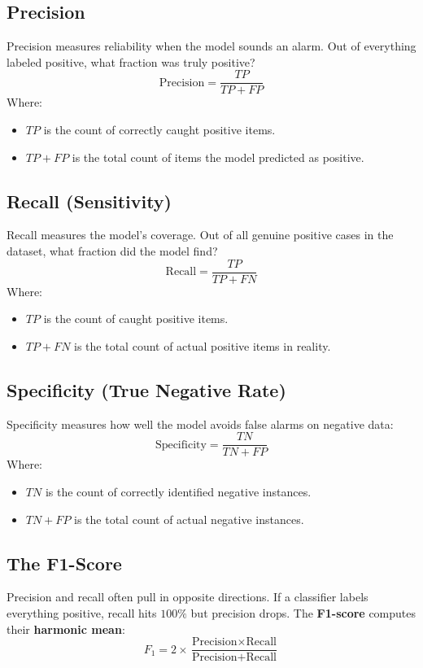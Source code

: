 \documentclass[a4paper,11pt]{article}
\newcommand{\vocab}[1]{\textbf{#1}}
\begin{document}
\subsection{Precision}
Precision measures reliability when the model sounds an alarm.
Out of everything labeled positive, what fraction was truly positive?
\begin{equation}
\text{Precision} = \frac{TP}{TP + FP}
\end{equation}
Where:
\begin{itemize}
  \item $TP$ is the count of correctly caught positive items.
  \item $TP + FP$ is the total count of items the model predicted as positive.
\end{itemize}

\subsection{Recall (Sensitivity)}
Recall measures the model's coverage.
Out of all genuine positive cases in the dataset, what fraction did the model find?
\begin{equation}
\text{Recall} = \frac{TP}{TP + FN}
\end{equation}
Where:
\begin{itemize}
  \item $TP$ is the count of caught positive items.
  \item $TP + FN$ is the total count of actual positive items in reality.
\end{itemize}

\subsection{Specificity (True Negative Rate)}
Specificity measures how well the model avoids false alarms on negative data:
\begin{equation}
\text{Specificity} = \frac{TN}{TN + FP}
\end{equation}
Where:
\begin{itemize}
  \item $TN$ is the count of correctly identified negative instances.
  \item $TN + FP$ is the total count of actual negative instances.
\end{itemize}

\subsection{The F1-Score}
Precision and recall often pull in opposite directions.
If a classifier labels everything positive, recall hits $100\%$ but precision drops.
The \vocab{F1-score} computes their \vocab{harmonic mean}:
\begin{equation}
F_1 = 2 \times \frac{\text{Precision} \times \text{Recall}}{\text{Precision} + \text{Recall}}
\end{equation}
\end{document}
